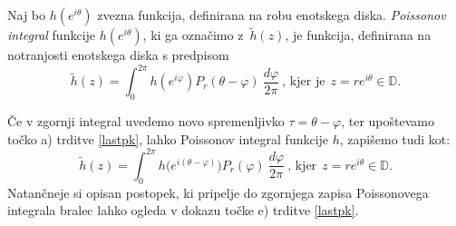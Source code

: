 \documentclass[mat1]{fmfdelo}
\begin{document}
    \begin{definicija}
        Naj bo $h(e^{i \theta})$ zvezna funkcija, definirana na robu enotskega diska.
        \emph{Poissonov integral} funkcije $h(e^{i\theta})$, ki ga označimo z~$\widetilde{h}(z)$, je funkcija, definirana na notranjosti enotskega diska s predpisom
        $$
        \widetilde{h}(z) = \int_{0}^{2\pi}{h(e^{i\varphi}) P_r(\theta - \varphi)~\frac{d\varphi}{2 \pi}}~\text{, kjer je}~~z = r e^{i\theta} \in \mathbb{D}.
        $$
     \end{definicija}
     \begin{opomba}
        \label{kom_poiss}
        Če v zgornji integral uvedemo novo spremenljivko $\tau = \theta - \varphi$, ter upoštevamo točko a) trditve \ref{lastpk}, lahko Poissonov integral funkcije $h$, zapišemo tudi kot:
        $$
        \widetilde{h}(z) = \int_{0}^{2\pi}{h\big(e^{i(\theta-\varphi)}\big) P_r(\varphi)~\frac{d\varphi}{2 \pi}}~\text{, kjer}~~z = r e^{i\theta} \in \mathbb{D}.
        $$
        Natančneje si opisan postopek, ki pripelje do zgornjega zapisa Poissonovega integrala bralec lahko ogleda v dokazu točke e) trditve \ref{lastpk}.
     \end{opomba}
\end{document}
